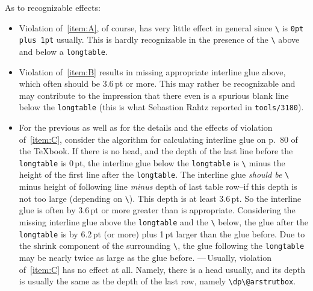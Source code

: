 \documentclass[DIV=9, parskip=half, pagesize=auto]{scrartcl}
\makeatletter
\newcommand*{\cs}[1]{\texttt{\textbackslash#1}}
\newcommand*{\cmd}[1]{\cs{\expandafter\@gobble\string#1}}
\newcommand*{\env}[1]{\texttt{#1}}
\makeatother
\begin{document}
As to recognizable effects: 
%
\begin{itemize}
\item Violation of~\ref{item:A}, of course, has very little effect in 
  general since \cmd{\parskip} is \texttt{0pt plus 1pt} usually. This is hardly 
  recognizable in the presence of the \cmd{\bigskipamount} above and 
  below a \env{longtable}. 
  
\item Violation of~\ref{item:B} results in missing appropriate interline 
  glue above, which often should be 3.6\,pt or more. This may 
  rather be recognizable and may contribute to the impression 
  that there even is a spurious blank line below the \env{longtable} 
  (this is what Sebastion Rahtz reported in \texttt{tools/3180}). 
  
\item For the previous as well as for the details and the 
  effects of violation of~\ref{item:C}, consider the algorithm for 
  calculating interline glue on p.~80 of the \TeX book. If there 
  is no head, and the depth of the last line before the 
  \env{longtable} is 0\,pt, the interline glue below the \env{longtable} is 
  \cmd{\baselineskip} minus the height of the first line after the 
  \env{longtable}. The interline glue \emph{should be} \cmd{\baselineskip} minus 
  height of following line \emph{minus} depth of last table row--if 
  this depth is not too large (depending on \cmd{\lineskiplimit}). 
  This depth is at least 3.6\,pt. So the interline glue is often 
  by 3.6\,pt or more greater than is appropriate. Considering the 
  missing interline glue above the \env{longtable} and the \cmd{\parskip}
  below, the glue after the \env{longtable} is by 6.2\,pt (or more) plus 
  1\,pt larger than the glue before. Due to the shrink component 
  of the surrounding \cmd{\bigskipamount}, the glue following the 
  \env{longtable} may be nearly twice as large as the glue before.
  ---\,Usually, violation of~\ref{item:C} has no effect at all. Namely, 
  there is a head usually, and its depth is usually the same as 
  the depth of the last row, namely \verb+\dp\@arstrutbox+. 
\end{itemize}


\end{document}
